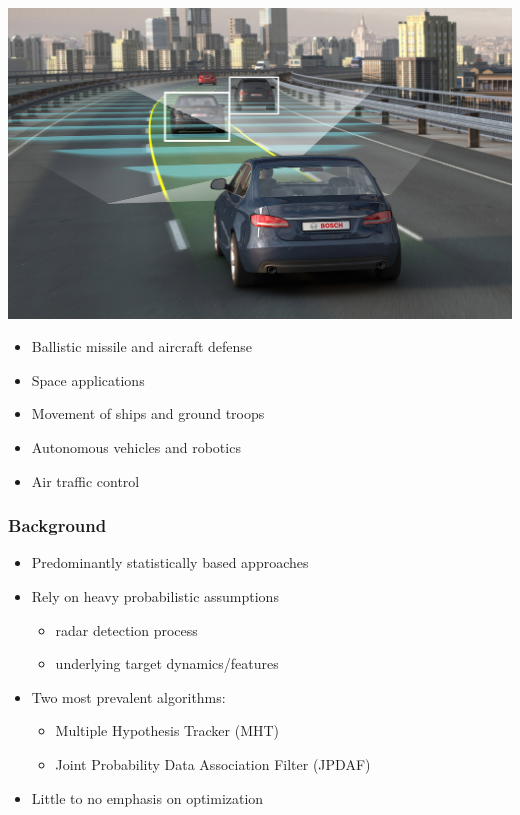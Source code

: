 \documentclass{beamer}
\begin{document}
\begin{frame}
\includegraphics[width=\textwidth,height=0.4\textheight,keepaspectratio]{car.jpg}
\begin{itemize}
\item Ballistic missile and aircraft defense
\item Space applications
\item Movement of ships and ground troops
\item Autonomous vehicles and robotics
\item Air traffic control
\end{itemize}
\end{frame} 

\begin{frame}
\frametitle{Background}
\begin{itemize}
\item Predominantly statistically based approaches
\item Rely on heavy probabilistic assumptions 
\begin{itemize}
\item radar detection process
\item underlying target dynamics/features
\end{itemize}
\item Two most prevalent algorithms: 
\begin{itemize}
\item Multiple Hypothesis Tracker (MHT) 
\item Joint Probability Data Association Filter (JPDAF)
\end{itemize}
\item Little to no emphasis on optimization
\end{itemize}
\end{frame} 
\end{document}
